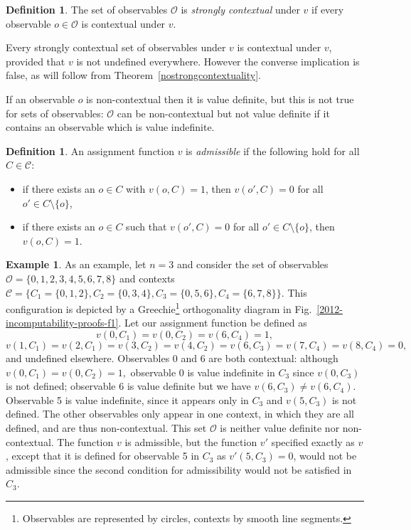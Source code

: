 \documentclass[%
 preprint,
 showpacs,
 showkeys,
 amsmath,
 amssymb,
 aps,
 pra,
 ]{revtex4-1}
\theoremstyle{definition}
\newtheorem{Definition}[Theorem]{Definition}
\newtheorem{Example}[Theorem]{Example}
\begin{document}
\begin{Definition}
	The set of observables $\mathcal{O}$ is \emph{strongly contextual} under $v$ if every observable $o\in\mathcal{O}$ is contextual under $v$.
\end{Definition}

Every strongly contextual set of observables under $v$ is contextual under $v$, provided that $v$ is not undefined everywhere.
However the converse implication is false, as will follow from Theorem~\ref{nostrongcontextuality}.

If an observable $o$ is non-contextual then it is value definite, but this is not true for sets of observables: $\mathcal{O}$ can be non-contextual but not value definite if it contains an observable which is value indefinite.\\

\begin{Definition}
	An assignment function $v$ is \emph{admissible} if the following hold for all $C \in \mathcal{C}$:
	\begin{itemize}
		\item if there exists an $o\in C$ with $v(o,C)=1$, then $v(o',C)=0$ for all $o'\in C\setminus\{o\}$,
		\item if there exists an $o\in C$ such that $v(o',C)=0$ for all $o'\in C\setminus \{o\}$, then $v(o,C)=1$.\\
	\end{itemize}
\end{Definition}

\begin{Example}
	As an example, let $n=3$ and consider the set of observables $\mathcal{O}=\{0,1,2,3,4,5,6,7,8\}$ and contexts $\mathcal{C}=\{C_1=\{0,1,2\},C_2=\{0,3,4\},C_3=\{0,5,6\},C_4=\{6,7,8\}\}$.
This configuration is depicted by a Greechie\footnote{Observables are represented by circles, contexts by smooth line segments.}
orthogonality diagram \cite{greechie:71,pulmannova-91,svozil-tkadlec} in Fig.~\ref{2012-incomputability-proofs-f1}.
	Let our assignment function be defined as $$v(0,C_1)=v(0,C_2)=v(6,C_4)=1,$$ $$v(1,C_1)=v(2,C_1)=v(3,C_2)=v(4,C_2)=v(6,C_3)=v(7,C_4)=v(8,C_4)=0,$$ and undefined elsewhere.
	Observables 0 and 6 are both contextual: although $v(0,C_1)=v(0,C_2)=1,$ observable 0 is value indefinite in $C_3$ since $v(0,C_3)$ is not defined; observable 6 is value definite but we have $v(6,C_3)\neq v(6,C_4)$.
	Observable 5 is value indefinite, since it appears only in $C_3$ and $v(5,C_3)$ is not defined.
	The other observables only appear in one context, in which they are all defined, and are thus non-contextual.
	This set $\mathcal{O}$ is neither value definite nor non-contextual.
	The function $v$ is admissible, but the function $v'$ specified exactly as $v$, except that it is defined for observable 5 in $C_3$ as $v'(5,C_3)=0$, would not be admissible since the second condition for admissibility would not be satisfied in $C_3$.
\end{Example}
\end{document}
